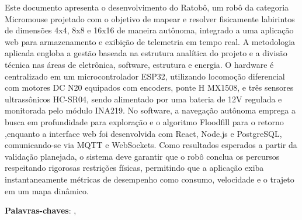 \begin{resumo}

Este documento apresenta o desenvolvimento do Ratobô, um robô da categoria Micromouse projetado com o objetivo de mapear e resolver 
fisicamente labirintos de dimensões 4x4, 8x8 e 16x16 de maneira autônoma, integrado a uma aplicação web para armazenamento e exibição de telemetria em tempo real. 
A metodologia aplicada engloba a gestão baseada na estrutura analítica do projeto e a divisão técnica nas áreas de eletrônica, software, estrutura e energia. 
O hardware é centralizado em um microcontrolador ESP32, utilizando locomoção diferencial com motores DC N20 equipados com encoders, ponte H MX1508, e três sensores 
ultrassônicos HC-SR04, sendo alimentado por uma bateria de 12V regulada e monitorada pelo módulo INA219. No software, a navegação autônoma emprega a busca em 
profundidade para exploração e o algoritmo Floodfill para o retorno ,enquanto a interface web foi desenvolvida com React, Node.js e PostgreSQL, comunicando-se 
via MQTT e WebSockets. Como resultados esperados a partir da validação planejada, o sistema deve garantir que o robô conclua os percursos respeitando rigorosas restrições 
físicas, permitindo que a aplicação exiba instantaneamente métricas de desempenho como consumo, velocidade e o trajeto em um mapa dinâmico.

\vspace{\onelineskip}
\noindent
\textbf{Palavras-chaves}:  \imprimirpalavrachaveum, \imprimirpalavrachavedois
\end{resumo}
